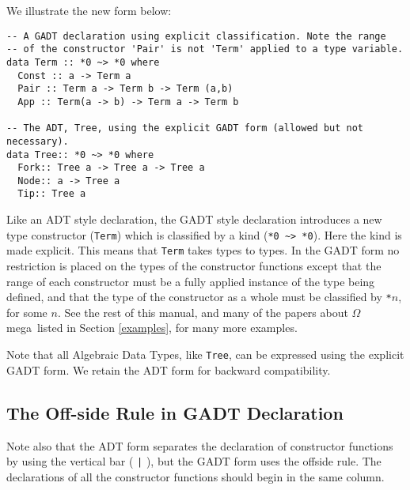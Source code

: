 \documentclass[11pt,twoside]{article}
\newcommand{\om}{$\Omega$mega}
\begin{document}
\noindent
We illustrate the new form below:

\begin{verbatim}
-- A GADT declaration using explicit classification. Note the range
-- of the constructor 'Pair' is not 'Term' applied to a type variable.
data Term :: *0 ~> *0 where
  Const :: a -> Term a
  Pair :: Term a -> Term b -> Term (a,b)
  App :: Term(a -> b) -> Term a -> Term b

-- The ADT, Tree, using the explicit GADT form (allowed but not necessary).
data Tree:: *0 ~> *0 where
  Fork:: Tree a -> Tree a -> Tree a
  Node:: a -> Tree a
  Tip:: Tree a
\end{verbatim}

Like an ADT style declaration, the GADT style declaration introduces a new
type constructor ({\tt Term}) which is classified by a kind (\verb+*0 ~> *0+). Here
the kind is made explicit. This means that {\tt Term} takes types to types.
In the GADT form no restriction is placed on the types of the constructor
functions except that the range of each constructor must be a fully applied
instance of the type being defined, and that the type of the constructor as
a whole must be classified by \verb+*+$n$, for some $n$. See the rest of this
manual, and many of the papers about \om\
listed in Section \ref{examples}, for many more examples.

Note that all Algebraic Data Types, like {\tt Tree}, can be expressed using
the explicit GADT form. We retain the ADT form for backward compatibility.

\subsection{The Off-side Rule in GADT Declaration}
Note also that the ADT form separates the declaration of constructor
functions by using the vertical bar ( \verb+|+ ), but the GADT form uses
the offside rule. The declarations of all the constructor functions should
begin in the same column.
\end{document}
